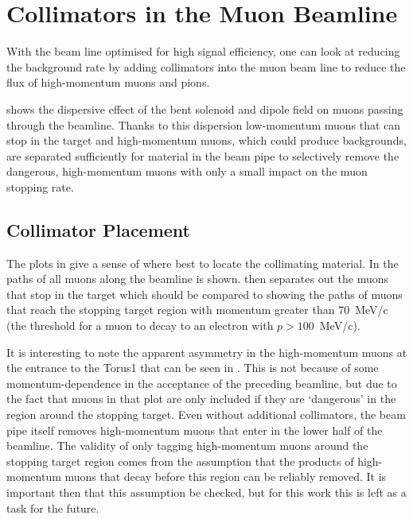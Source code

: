 \section{Collimators in the Muon Beamline}
\FigOptimMuBeamDipoleMuDispersion
With the beam line optimised for high signal efficiency, one can look at reducing the background rate by adding collimators into the muon beam line to reduce the flux of high-momentum muons and pions.

 shows the dispersive effect of the bent solenoid and dipole field on muons passing through the beamline.
Thanks to this dispersion low-momentum muons that can stop in the target and high-momentum muons, which could produce backgrounds, are separated sufficiently for material in the beam pipe to selectively remove the dangerous, high-momentum muons with only a small impact on the muon stopping rate.

\subsection{Collimator Placement}
\FigOptimMuBeamCollimMuonPaths
The plots in  give a sense of where best to locate the collimating material.
In  the paths of all muons along the beamline is shown.
 then separates out the muons that stop in the target which should be compared to 
 showing the paths of muons that reach the stopping target region with momentum greater than 70~MeV/c (the threshold for a muon to decay to an electron with $p>100$~MeV/c).

It is interesting to note the apparent asymmetry in the high-momentum muons at the entrance to the Torus1 that can be seen in .  
This is not because of some momentum-dependence in the acceptance of the preceding beamline, but due to the fact that muons in that plot are only included if they are `dangerous' in the region around the stopping target.
Even without additional collimators, the beam pipe itself removes high-momentum muons that enter in the lower half of the beamline.
The validity of only tagging high-momentum muons around the stopping target region comes from the assumption that the products of high-momentum muons that decay before this region can be reliably removed.
It is important then that this assumption be checked, but for this work this is left as a task for the future.

